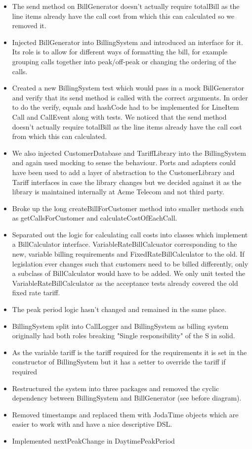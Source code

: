 \documentclass[a4paper,11pt]{article}
\begin{document}
\begin{itemize}
\item The send method on BillGenerator doesn't actually require totalBill as the line items already have the call cost from which this can calculated so we removed it.
\item Injected BillGenerator into BillingSystem and introduced an interface for it. Its role is to allow for different ways of formatting the bill, for example grouping calls together into peak/off-peak or changing the ordering of the calls.
\item Created a new BillingSystem test which would pass in a mock BillGenerator and verify that its send method is called with the correct arguments. In order to do the verify, equals and hashCode had to be implemented for LineItem Call and CallEvent along with tests.  We noticed that the send method doesn't actually require totalBill as the line items already have the call cost from which this can calculated.
\item We also injected CustomerDatabase and TariffLibrary into the BillingSystem and again used mocking to sense the behaviour. Ports and adapters could have been used to add a layer of abstraction to the CustomerLibrary and Tariff interfaces in case the library changes but we decided against it as the library is maintained internally at Acme Telecom and not third party.
\item Broke up the long createBillForCustomer method into smaller methods such as getCallsForCustomer and calculateCostOfEachCall. 
\item Separated out the logic for calculating call costs into classes which implement a BillCalculator interface.  VariableRateBillCalcuator corresponding to the new, variable billing requirements and FixedRateBillCalculator to the old. If legislation ever changes such that customers need to be billed differently, only a subclass of BillCalculator would have to be added. We only unit tested the VariableRateBillCalculator as the acceptance tests already covered the old fixed rate tariff.
\item The peak period logic hasn't changed and remained in the same place.
\item BillingSystem split into CallLogger and BillingSystem as billing system originally had both roles breaking "Single responsibility" of the S in solid.
\item As the variable tariff is the tariff required for the requirements it is set in the constructor of BillingSystem but it has a setter to override the tariff if required
\item Restructured the system into three packages and removed the cyclic dependency between BillingSystem and BillGenerator (see before diagram).
\item Removed timestamps and replaced them with JodaTime objects which are easier to work with and have a nice descriptive DSL.
\item Implemented nextPeakChange in DaytimePeakPeriod 
\end{itemize}
\end{document}
